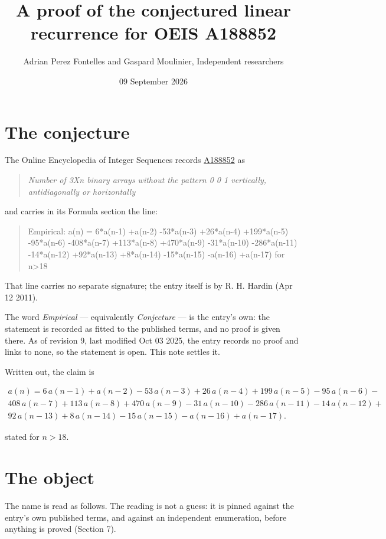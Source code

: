 \documentclass[11pt]{article}
\title{A proof of the conjectured linear recurrence for OEIS A188852}
\author{Adrian Perez Fontelles and Gaspard Moulinier, Independent researchers}
\date{09 September 2026}
\theoremstyle{definition}
\begin{document}
\maketitle
\section{The conjecture}

The Online Encyclopedia of Integer Sequences records \href{https://oeis.org/A188852}{A188852} as

\begin{quote}\itshape Number of 3Xn binary arrays without the pattern 0 0 1 vertically, antidiagonally or horizontally\end{quote}

and carries in its Formula section the line:

\begin{quote}\ttfamily Empirical: a(n) = 6*a(n-1) +a(n-2) -53*a(n-3) +26*a(n-4) +199*a(n-5) -95*a(n-6) -408*a(n-7) +113*a(n-8) +470*a(n-9) -31*a(n-10) -286*a(n-11) -14*a(n-12) +92*a(n-13) +8*a(n-14) -15*a(n-15) -a(n-16) +a(n-17) for n>18\end{quote}

That line carries no separate signature; the entry itself is by R. H. Hardin (Apr 12 2011).

The word {\itshape Empirical} --- equivalently {\itshape Conjecture} --- is the entry's own: the statement is recorded as fitted to the published terms, and no proof is given there. As of revision 9, last modified Oct 03 2025, the entry records no proof and links to none, so the statement is open. This note settles it.

Written out, the claim is

\begin{multline*} a(n) = 6\,a(n-1) + a(n-2) - 53\,a(n-3) + 26\,a(n-4) + 199\,a(n-5) - 95\,a(n-6) - \\ 408\,a(n-7) + 113\,a(n-8) + 470\,a(n-9) - 31\,a(n-10) - 286\,a(n-11) - 14\,a(n-12) + \\ 92\,a(n-13) + 8\,a(n-14) - 15\,a(n-15) - a(n-16) + a(n-17). \end{multline*}

stated for $n > 18$.

\section{The object}

The name is read as follows. The reading is not a guess: it is pinned against the entry's own published terms, and against an independent enumeration, before anything is proved (Section 7).
\end{document}
